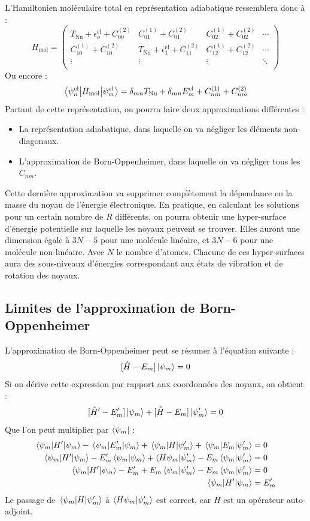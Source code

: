 L'Hamiltonien moléculaire total en représentation adiabatique ressemblera donc à :
\[
H_\text{mol} =
\begin{pmatrix}
T_\text{Nu} + \epsilon_o^\text{el} + C_{00}^{(2)} & C_{01}^{(1)}+C_{01}^{(2)} & C_{02}^{(1)}+C_{02}^{(2)} & \cdots \\
C_{10}^{(1)}+C_{10}^{(2)} & T_\text{Nu} + \epsilon_1^\text{el} + C_{11}^{(2)} & C_{12}^{(1)}+C_{12}^{(2)} & \cdots \\
\vdots  & \vdots  & \vdots & \ddots  \\
\end{pmatrix}
\]
Ou encore :
\[
\mel{\psi^\text{el}_n}{H_\text{mol}}{\psi^\text{el}_m} = \delta_{mn}T_\text{Nu} + \delta_{mn}E_m^\text{el} + C_{nm}^{(1)} + C_{nm}^{(2)}
\]
Partant de cette représentation, on pourra faire deux approximations différentes :
\begin{itemize}
    \item La représentation adiabatique, dans laquelle on va négliger les éléments non-diagonaux.
    \item L'approximation de Born-Oppenheimer, dans laquelle on va négliger tous les $C_{nm}$.
\end{itemize}
Cette dernière approximation va supprimer complètement la dépendance en la masse du noyau de l'énergie électronique. En pratique, en calculant les solutions pour un certain nombre de $R$ différents, on pourra obtenir une hyper-surface d'énergie potentielle sur laquelle les noyaux peuvent se trouver. Elles auront une dimension égale à $3N - 5$ pour une molécule linéaire, et $3N - 6$ pour une molécule non-linéaire. Avec $N$ le nombre d'atomes. Chacune de ces hyper-surfaces aura des sous-niveaux d'énergies correspondant aux états de vibration et de rotation des noyaux.


\subsection{Limites de l'approximation de Born-Oppenheimer}


L'approximation de Born-Oppenheimer peut se résumer à l'équation suivante :
\[
[\hat{H}-E_m]\ket{\psi_m} = 0
\]
Si on dérive cette expression par rapport aux coordonnées des noyaux, on obtient :
\begin{equation}\label{eq:3}
[\hat{H}'-E_m']\ket{\psi_m} + [\hat{H}-E_m]\ket{\psi_m'} = 0
\end{equation}
Que l'on peut multiplier par $\bra{\psi_m}$ :
\begin{align*}
\mel{\psi_m}{H'}{\psi_m} - \mel{\psi_m}{E_m'}{\psi_m} + \mel{\psi_m}{H}{\psi_m'} + \mel{\psi_m}{E_m}{\psi_m'} & = 0 \\
\mel{\psi_m}{H'}{\psi_m} - E_m'\braket{\psi_m}{\psi_m} + \braket{H\psi_m}{\psi_m'} - E_m \braket{\psi_m}{\psi_m'} & = 0 \\
\mel{\psi_m}{H'}{\psi_m} - E_m' + E_m\braket{\psi_m}{\psi_m'} - E_m \braket{\psi_m}{\psi_m'} & = 0 \\
\mel{\psi_m}{H'}{\psi_m} & = E_m'
\end{align*}
Le passage de $\mel{\psi_m}{H}{\psi_m'}$ à $\braket{H\psi_m}{\psi_m'}$ est correct, car $H$ est un opérateur auto-adjoint.


